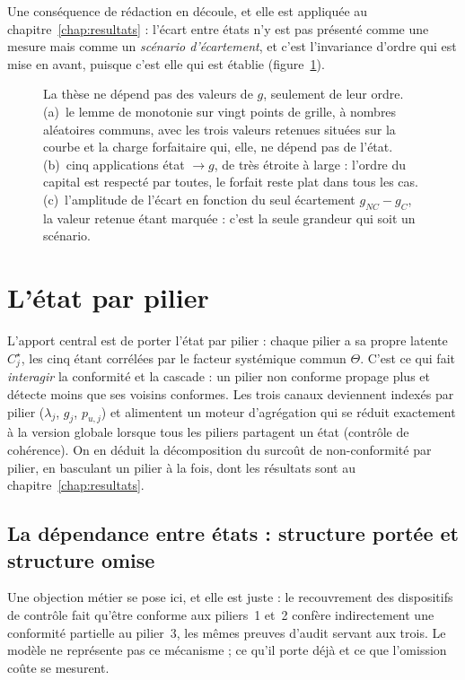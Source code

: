 Une conséquence de rédaction en découle, et elle est appliquée au
chapitre~\ref{chap:resultats} : l'écart entre états n'y est pas présenté comme une mesure mais
comme un \emph{scénario d'écartement}, et c'est l'invariance d'ordre qui est mise en avant,
puisque c'est elle qui est établie (figure~\ref{fig:invariance-g}).

\begin{figure}[htbp]
\centering
{}
\caption{La thèse ne dépend pas des valeurs de $g$, seulement de
leur ordre. (a)~le lemme de monotonie sur vingt points de grille, à nombres aléatoires
communs, avec les trois valeurs retenues situées sur la courbe et la charge forfaitaire qui,
elle, ne dépend pas de l'état. (b)~cinq applications état $\to g$, de très étroite à
large : l'ordre du capital est respecté par toutes, le forfait reste plat dans tous les cas.
(c)~l'amplitude de l'écart en fonction du seul écartement $g_{NC}-g_C$, la valeur
retenue étant marquée : c'est la seule grandeur qui soit un scénario.}
\label{fig:invariance-g}
\end{figure}

\section{L'état par pilier}

L'apport central est de porter l'état par pilier : chaque pilier a sa propre latente
$C^\star_j$, les cinq étant corrélées par le facteur systémique commun $\Theta$. C'est ce qui
fait \emph{interagir} la conformité et la cascade : un pilier non conforme propage plus et
détecte moins que ses voisins conformes. Les trois canaux deviennent indexés par pilier
($\lambda_j$, $g_j$, $p_{u,j}$) et alimentent un moteur d'agrégation qui se réduit exactement à
la version globale lorsque tous les piliers partagent un état (contrôle de cohérence). On en
déduit la décomposition du surcoût de non-conformité par pilier, en basculant un pilier
à la fois, dont les résultats sont au chapitre~\ref{chap:resultats}.

\subsection{La dépendance entre états : structure portée et structure omise}
\label{sec:dependance-etats}


Une objection métier se pose ici, et elle est juste : le
recouvrement des dispositifs de contrôle fait qu'être conforme aux piliers~1 et~2 confère
indirectement une conformité partielle au pilier~3, les mêmes preuves d'audit servant aux trois.
Le modèle ne représente pas ce mécanisme ; ce qu'il porte déjà et ce que l'omission coûte se
mesurent.

